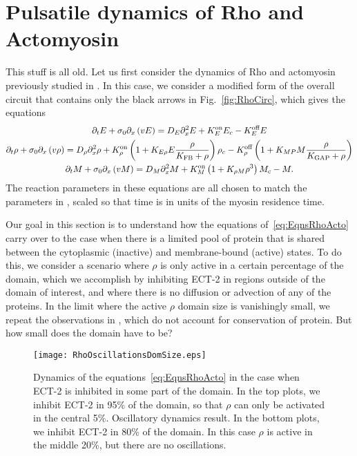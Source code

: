 \documentclass[11pt]{article}
\newcommand{\red}[1]{\color{red}#1\normalcolor}
\begin{document}
\section{Pulsatile dynamics of Rho and Actomyosin \label{sec:pulse}}
\red{This stuff is all old.} Let us first consider the dynamics of Rho and actomyosin previously studied in \cite{michaux2018excitable}. In this case, we consider a modified form of the overall circuit that contains only the black arrows in Fig.\ \ref{fig:RhoCirc}, which gives the equations \cite{michaux2018excitable}
\begin{subequations}
\label{eq:EqnsRhoActo}
\begin{gather}
\partial_t E + \sigma_0 \partial_x \left( v E\right) = D_E \partial_x^2 E +K^\text{on}_E E_c - K^\text{off}_E E \\
\partial_t \rho + \sigma_0 \partial_x \left( v \rho \right) = D_\rho \partial_x^2 \rho + K^\text{on}_\rho \left(1+ K_{E \rho}E \frac{ \rho}{K_\text{FB}+\rho}\right)\rho_c - K^\text{off}_\rho \left(1+K_{MP}M \frac{\rho}{K_\text{GAP}+\rho}\right)\\
\partial_t M + \sigma_0 \partial_x \left( v M \right) = D_M \partial_x^2 M + K^\text{on}_M \left(1+K_{\rho M} \rho^3 \right) M_c - M. 
\end{gather} 
\end{subequations}
The reaction parameters in these equations are all chosen to match the parameters in \cite{michaux2018excitable}, scaled so that time is in units of the myosin residence time. 

Our goal in this section is to understand how the equations of\ \eqref{eq:EqnsRhoActo} carry over to the case when there is a limited pool of protein that is shared between the cytoplasmic (inactive) and membrane-bound (active) states. To do this, we consider a scenario where $\rho$ is only active in a certain percentage of the domain, which we accomplish by inhibiting ECT-2 in regions outside of the domain of interest, and where there is no diffusion or advection of any of the proteins. In the limit where the active $\rho$ domain size is vanishingly small, we repeat the observations in \cite{michaux2018excitable}, which do not account for conservation of protein. But how small does the domain have to be?

\begin{figure}
\centering
\texttt{[image: RhoOscillationsDomSize.eps]}
\caption{\label{fig:RhoDomainSize} Dynamics of the equations\ \eqref{eq:EqnsRhoActo} in the case when ECT-2 is inhibited in some part of the domain. In the top plots, we inhibit ECT-2 in 95\% of the domain, so that $\rho$ can only be activated in the central 5\%. Oscillatory dynamics result. In the bottom plots, we inhibit ECT-2 in 80\% of the domain. In this case $\rho$ is active in the middle 20\%, but there are no oscillations. }
\end{figure}
\end{document}
